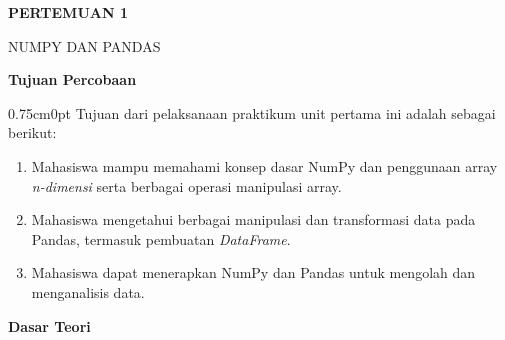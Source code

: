 \documentclass[12pt,a4paper]{article}
\begin{document}
\thispagestyle{fancy}
\onehalfspacing
\vspace*{0.3cm}
\tableofcontents
\vspace*{0.5cm}

\newpage
{}
\setcounter{page}{1}
\onehalfspacing


\begin{center}
    {\fontsize{14}{18}\selectfont\bfseries
    PERTEMUAN 1\par
    NUMPY DAN PANDAS\par
    }
    \vspace{0.35cm}
\end{center}

{}
\noindent{}\textbf{\normalsize Tujuan Percobaan}\par
\vspace{0.15cm}
\begin{adjustwidth}{0.75cm}{0pt}
\hspace*{0.85cm}Tujuan dari pelaksanaan praktikum unit pertama ini adalah sebagai berikut:
\end{adjustwidth}

\begin{enumerate}
    \item Mahasiswa mampu memahami konsep dasar NumPy dan penggunaan array \textit{n-dimensi} serta berbagai operasi manipulasi array.
    \item Mahasiswa mengetahui berbagai manipulasi dan transformasi data pada Pandas, termasuk pembuatan \textit{DataFrame}.
    \item Mahasiswa dapat menerapkan NumPy dan Pandas untuk mengolah dan menganalisis data.
\end{enumerate}

\vspace{0.3cm}
{}
\noindent{}\textbf{\normalsize Dasar Teori}\par
\vspace{0.15cm}
\end{document}
